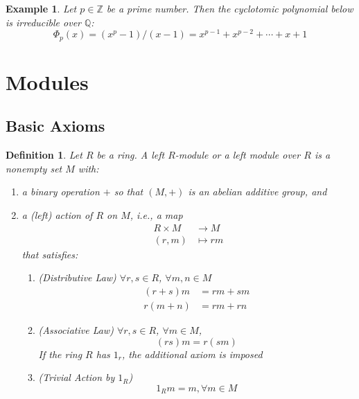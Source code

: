 \documentclass[a4paper,8pt]{article}
\newcommand{\Q}{\mathbb{Q}}
\newcommand{\Z}{\mathbb{Z}}
\newcommand{\hlt}[1]{\textit{{\color{blue}#1}}}
\theoremstyle{theorem}
\newtheorem{definition}[theorem]{Definition}
\newtheorem{example}[theorem]{Example}
\begin{document}
\begin{example}
Let $p \in \Z$ be a prime number. Then the \hlt{cyclotomic polynomial} below is irreducible over $\Q$:
\begin{equation}
\Phi_p (x) = (x^p - 1)/(x-1) = x^{p-1} + x^{p-2} + \cdots + x + 1 \nonumber
\end{equation}
\end{example}

\newpage

\section{Modules}

\subsection{Basic Axioms}

\begin{definition}
Let $R$ be a ring. A \hlt{left $R$-module} or a \hlt{left module over $R$} is a nonempty set $M$ with:
\begin{enumerate}[label=(\roman*)]
\item a binary operation $+$ so that $(M, +)$ is an abelian additive group, and
\item a (left) action of $R$ on $M$, i.e., a map
\begin{align}
R \times M &\rightarrow M \nonumber \\
(r, m) &\mapsto rm \nonumber
\end{align}
that satisfies:
\begin{enumerate}[label=\alph*.]
\item \hlt{(Distributive Law)} $\forall r,s \in R$, $\forall m,n \in M$
\begin{align}
(r+s)m &= rm + sm \nonumber \\
r(m+n) &= rm + rn \nonumber
\end{align}
\item \hlt{(Associative Law)} $\forall r,s \in R$, $\forall m \in M$,
\begin{equation}
(rs)m = r(sm) \nonumber
\end{equation}
If the ring $R$ has $1_r$, the additional axiom is imposed
\item \hlt{(Trivial Action by $1_R$)}
\begin{equation}
1_R m = m, \forall m \in M \nonumber
\end{equation}
\end{enumerate}
\end{enumerate}
\end{definition}
\end{document}
